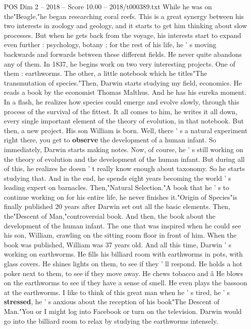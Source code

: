 \begin{textsample}{POS Dim 2 – 2018 – Score 10.00 – 2018/t000389.txt}
While he was on the"Beagle,"he began researching coral reefs.
This is a great synergy between his two interests in zoology and geology, and it starts to get him thinking about slow processes.
But when he gets back from the voyage, his interests start to expand even further : psychology, botany ; for the rest of his life, he ' s moving backwards and forwards between these different fields.
He never quite abandons any of them.
In 1837, he begins work on two very interesting projects.
One of them : earthworms.
The other, a little notebook which he titles"The transmutation of species."Then, Darwin starts studying my field, economics.
He reads a book by the economist Thomas Malthus.
And he has his eureka moment.
In a flash, he realizes how species could emerge and evolve slowly, through this process of the survival of the fittest.
It all comes to him, he writes it all down, every single important element of the theory of evolution, in that notebook.
But then, a new project.
His son William is born.
Well, there ' s a natural experiment right there, you get to \textbf{observe} the development of a human infant.
So immediately, Darwin starts making notes.
Now, of course, he ' s still working on the theory of evolution and the development of the human infant.
But during all of this, he realizes he doesn ' t really know enough about taxonomy.
So he starts studying that.
And in the end, he spends eight years becoming the world ' s leading expert on barnacles.
Then,"Natural Selection."A book that he ' s to continue working on for his entire life, he never finishes it."Origin of Species"is finally published 20 years after Darwin set out all the basic elements.
Then, the"Descent of Man,"controversial book.
And then, the book about the development of the human infant.
The one that was inspired when he could see his son, William, crawling on the sitting room floor in front of him.
When the book was published, William was 37 years old.
And all this time, Darwin ' s working on earthworms.
He fills his billiard room with earthworms in pots, with glass covers.
He shines lights on them, to see if they ' ll respond.
He holds a hot poker next to them, to see if they move away.
He chews tobacco and â He blows on the earthworms to see if they have a sense of smell.
He even plays the bassoon at the earthworms.
I like to think of this great man when he ' s tired, he ' s \textbf{stressed}, he ' s anxious about the reception of his book"The Descent of Man."You or I might log into Facebook or turn on the television.
Darwin would go into the billiard room to relax by studying the earthworms intensely.

\end{textsample}

